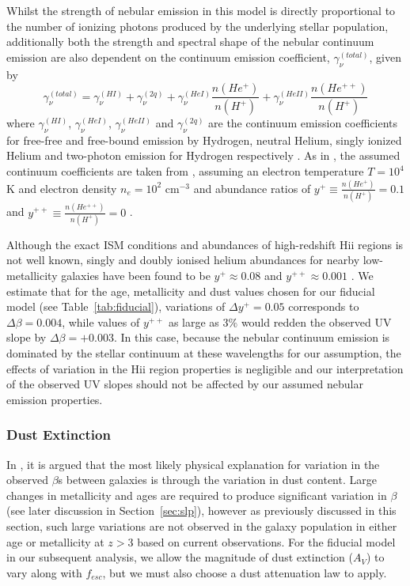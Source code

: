 Whilst the strength of nebular emission in this model is directly proportional to the number of ionizing photons produced by the underlying stellar population, additionally both the strength and spectral shape of the nebular continuum emission are also dependent on the continuum emission coefficient, $\gamma^{(total)}_{\nu}$, given by
\begin{equation}\label{eq:cont_sep}
\gamma^{(total)}_{\nu} = \gamma^{(HI)}_{\nu} + \gamma^{(2q)}_{\nu} +  \gamma^{(HeI)}_{\nu}\frac{n(He^{+})} {n(H^{+})} + \gamma^{(HeII)}_{\nu}\frac{n(He^{++})} {n(H^{+})}
\end{equation}
where $\gamma^{(HI)}_{\nu}$, $\gamma^{(HeI)}_{\nu}$, $\gamma^{(HeII)}_{\nu}$ and $\gamma^{(2q)}_{\nu}$ are the continuum emission coefficients for free-free and free-bound emission by Hydrogen, neutral Helium, singly ionized Helium and two-photon emission for Hydrogen respectively \citep{1995A&A...303...41K}. As in \citet{Duncan:2014gh}, the assumed continuum coefficients are taken from \cite{Osterbrock:2006ul}, assuming an electron temperature $T=10^4$ K and electron density $n_{e}=10^2$ cm$^{-3}$ and abundance ratios of $y^{+} \equiv \frac{n(He^{+})} {n(H^{+})} = 0.1$ and $y^{++} \equiv \frac{n(He^{++})} {n(H^{+})} = 0$ \citep{1995A&A...303...41K,Ono:2010ed}. 

Although the exact ISM conditions and abundances of high-redshift {\sc Hii} regions is not well known, singly and doubly ionised helium abundances for nearby low-metallicity galaxies have been found to be $y^{+} \approx 0.08$ and $y^{++} \approx 0.001$ \citep{Dinerstein:1986di,Izotov:1994fi,Hagele:2006eq}. We estimate that for the age, metallicity and dust values chosen for our fiducial model (see Table~\ref{tab:fiducial}), variations of $\Delta y^{+} = 0.05$ corresponds to $\Delta\beta = 0.004$, while values of $y^{++}$ as large as $3\%$ \citep{Izotov:2013ce} would redden the observed UV slope by $\Delta\beta = +0.003$. In this case, because the nebular continuum emission is dominated by the stellar continuum at these wavelengths for our assumption, the effects of variation in the {\sc Hii} region properties is negligible and our interpretation of the observed UV slopes should not be affected by our assumed nebular emission properties.

\subsubsection{Dust Extinction}\label{sec:models_dust}
In \citet{Bouwens:2009ik}, it is argued that the most likely physical explanation for variation in the observed $\beta$s between galaxies is through the variation in dust content. Large changes in metallicity and ages are required to produce significant variation in $\beta$ (see later discussion in Section~\ref{sec:slp}), however as previously discussed in this section, such large variations are not observed in the galaxy population in either age or metallicity at $z > 3$ based on current observations. For the fiducial model in our subsequent analysis, we allow the magnitude of dust extinction ($A_{V}$) to vary along with $f_{esc}$, but we must also choose a dust attenuation law to apply.

